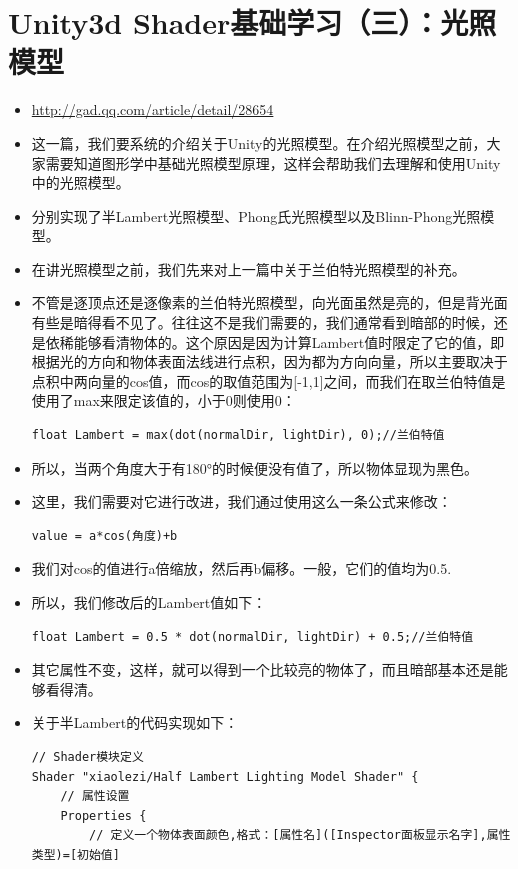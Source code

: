 \documentclass[9pt, b5paper]{article}
\begin{document}
\section{Unity3d Shader基础学习（三）：光照模型}
\label{sec-3}
\begin{itemize}
\item \url{http://gad.qq.com/article/detail/28654}
\item 这一篇，我们要系统的介绍关于Unity的光照模型。在介绍光照模型之前，大家需要知道图形学中基础光照模型原理，这样会帮助我们去理解和使用Unity中的光照模型。
\item 分别实现了半Lambert光照模型、Phong氏光照模型以及Blinn-Phong光照模型。
\item 在讲光照模型之前，我们先来对上一篇中关于兰伯特光照模型的补充。
\item 不管是逐顶点还是逐像素的兰伯特光照模型，向光面虽然是亮的，但是背光面有些是暗得看不见了。往往这不是我们需要的，我们通常看到暗部的时候，还是依稀能够看清物体的。这个原因是因为计算Lambert值时限定了它的值，即根据光的方向和物体表面法线进行点积，因为都为方向向量，所以主要取决于点积中两向量的cos值，而cos的取值范围为[-1,1]之间，而我们在取兰伯特值是使用了max来限定该值的，小于0则使用0：
\begin{verbatim}
float Lambert = max(dot(normalDir, lightDir), 0);//兰伯特值
\end{verbatim}
\item 所以，当两个角度大于有180°的时候便没有值了，所以物体显现为黑色。
\item 这里，我们需要对它进行改进，我们通过使用这么一条公式来修改：
\begin{verbatim}
value = a*cos(角度)+b
\end{verbatim}
\item 我们对cos的值进行a倍缩放，然后再b偏移。一般，它们的值均为0.5.
\item 所以，我们修改后的Lambert值如下：
\begin{verbatim}
float Lambert = 0.5 * dot(normalDir, lightDir) + 0.5;//兰伯特值
\end{verbatim}
\item 其它属性不变，这样，就可以得到一个比较亮的物体了，而且暗部基本还是能够看得清。
\item 关于半Lambert的代码实现如下：
\begin{verbatim}
// Shader模块定义  
Shader "xiaolezi/Half Lambert Lighting Model Shader" {  
    // 属性设置  
    Properties {  
        // 定义一个物体表面颜色,格式：[属性名]([Inspector面板显示名字],属性类型)=[初始值]  

\end{verbatim}
\end{itemize}
\end{document}
